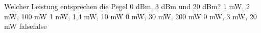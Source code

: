     {Welcher Leistung entsprechen die Pegel 0 dBm, 3 dBm und 20 dBm?}
    {1 mW, 2 mW, 100 mW}
    {1 mW, 1,4 mW, 10 mW}
    {0 mW, 30 mW, 200 mW}
    {0 mW, 3 mW, 20 mW}
    {false}{false}